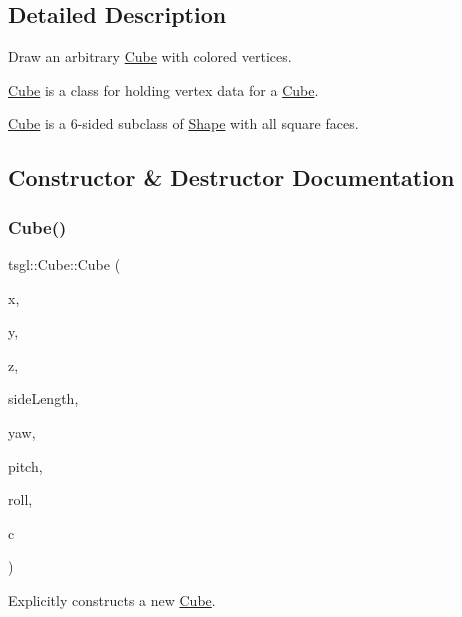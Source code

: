 \subsection{Detailed Description}
Draw an arbitrary \hyperlink{classtsgl_1_1_cube}{Cube} with colored vertices. 

\hyperlink{classtsgl_1_1_cube}{Cube} is a class for holding vertex data for a \hyperlink{classtsgl_1_1_cube}{Cube}.

\hyperlink{classtsgl_1_1_cube}{Cube} is a 6-\/sided subclass of \hyperlink{classtsgl_1_1_shape}{Shape} with all square faces. 

\subsection{Constructor \& Destructor Documentation}
\mbox{\label{classtsgl_1_1_cube_a44a6d1678cd6724d1039b2076e6dcedc}} 
\subsubsection{\texorpdfstring{Cube()}{Cube()}\hspace{0.1cm}{\footnotesize\ttfamily [1/2]}}
{\footnotesize\ttfamily tsgl\+::\+Cube\+::\+Cube (\begin{DoxyParamCaption}\item[{float}]{x,  }\item[{float}]{y,  }\item[{float}]{z,  }\item[{G\+Lfloat}]{side\+Length,  }\item[{float}]{yaw,  }\item[{float}]{pitch,  }\item[{float}]{roll,  }\item[{\hyperlink{structtsgl_1_1_color_float}{Color\+Float}}]{c }\end{DoxyParamCaption})}



Explicitly constructs a new \hyperlink{classtsgl_1_1_cube}{Cube}. 

